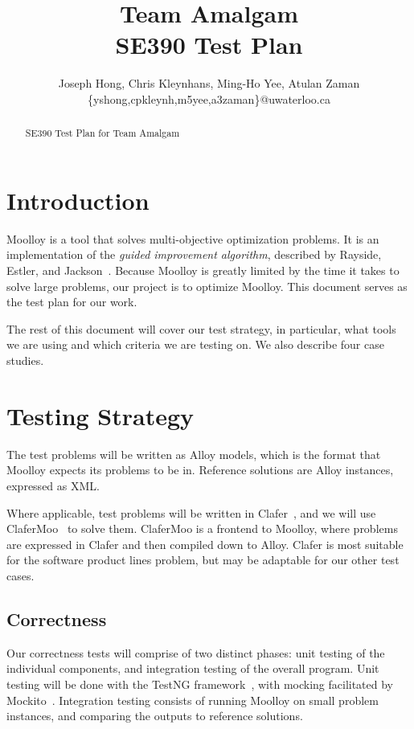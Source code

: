 \documentclass[11pt]{article}
\title{{\Large Team Amalgam} \\ SE390 Test Plan}
\author{Joseph Hong, Chris Kleynhans, Ming-Ho Yee, Atulan Zaman \\
        \{yshong,cpkleynh,m5yee,a3zaman\}@uwaterloo.ca}
\begin{document}
\maketitle

\begin{abstract}
SE390 Test Plan for Team Amalgam
\end{abstract}

\tableofcontents
\newpage

\section{Introduction}

Moolloy is a tool that solves multi-objective optimization problems. It
is an implementation of the \textit{guided improvement algorithm},
described by Rayside, Estler, and Jackson~\cite{ref:Rayside09}. Because
Moolloy is greatly limited by the time it takes to solve large
problems, our project is to optimize Moolloy. This document serves as
the test plan for our work.

The rest of this document will cover our test strategy, in particular,
what tools we are using and which criteria we are testing on. We also
describe four case studies.

\section{Testing Strategy}

The test problems will be written as Alloy models, which is the format
that Moolloy expects its problems to be in. Reference solutions are
Alloy instances, expressed as XML.

Where applicable, test problems will be written in
Clafer~\cite{ref:Bak10}, and we will use
ClaferMoo~\cite{ref:Olaechea12} to solve them. ClaferMoo is a frontend
to Moolloy, where problems are expressed in Clafer and then compiled
down to Alloy. Clafer is most suitable for the software product lines
problem, but may be adaptable for our other test cases.

\subsection{Correctness}

Our correctness tests will comprise of two distinct phases: unit
testing of the individual components, and integration testing of the
overall program. Unit testing will be done with the TestNG
framework~\cite{ref:testng}, with mocking facilitated by
Mockito~\cite{ref:mockito}. Integration testing consists of running
Moolloy on small problem instances, and comparing the outputs to
reference solutions.
\end{document}
